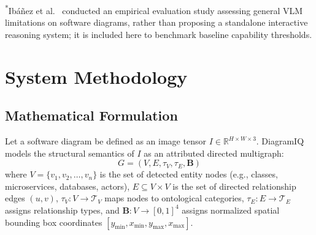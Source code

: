 \documentclass[runningheads]{llncs}
\begin{document}
\begin{table}[t]
\centering
\caption{Systematic comparison of DiagramIQ against existing multimodal diagram interpretation systems.}
\label{tab:comparison}
\vspace{1mm}
\raggedright\footnotesize{\textsuperscript{*}Ibáñez et al.~\cite{ibanez2025evaluating} conducted an empirical evaluation study assessing general VLM limitations on software diagrams, rather than proposing a standalone interactive reasoning system; it is included here to benchmark baseline capability thresholds.}
\end{table}

\section{System Methodology}
\label{sec:methodology}

\subsection{Mathematical Formulation}
Let a software diagram be defined as an image tensor $I \in \mathbb{R}^{H \times W \times 3}$. DiagramIQ models the structural semantics of $I$ as an attributed directed multigraph:
\begin{equation}
    G = (V, E, \tau_V, \tau_E, \mathbf{B})
\end{equation}
where $V = \{v_1, v_2, \dots, v_n\}$ is the set of detected entity nodes (e.g., classes, microservices, databases, actors), $E \subseteq V \times V$ is the set of directed relationship edges $(u, v)$, $\tau_V: V \rightarrow \mathcal{T}_V$ maps nodes to ontological categories, $\tau_E: E \rightarrow \mathcal{T}_E$ assigns relationship types, and $\mathbf{B}: V \rightarrow [0, 1]^4$ assigns normalized spatial bounding box coordinates $[y_{\min}, x_{\min}, y_{\max}, x_{\max}]$.
\end{document}

